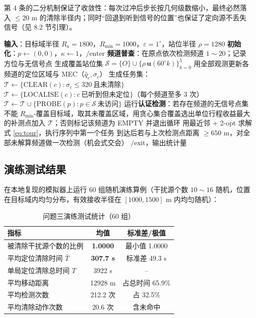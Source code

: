 第 4 条的二分机制保证了收敛性：每次过冲后步长按几何级数缩小，最终必然落入 $\le20$ m 的清除半径内；同时“回退到听到信号的位置”也保证了定向源不丢失信号（见 8.2 节引理）。

\begin{algorithm}[H]
\caption{问题三：全向干扰源搜索—定位—清除算法（CTC-V）}
\begin{algorithmic}[1]
\State \textbf{输入}：目标域半径 $R_a=1800$，$R_{\min}=1000$，$\varepsilon=1^{\circ}$，站位半径 $\rho=1280$
\State \textbf{初始化}：$p\gets(0,0)$，$\kappa\gets1$，$\text{/enter}$
\State \textbf{频道普查}：在原点依次检测频道 $1\sim20$；记录方位与无信号点
\State 生成覆盖站位集 $\mathcal S=\{O\}\cup\{\rho\,\mathbf u(60^{\circ}k)\}_{k=0}^{5}$
   \State 用全部观测更新各频道的定位区域与 MEC（$\hat q_c,\sigma_c$）
   \State 生成任务集：$\mathcal T\gets\{\text{CLEAR}(c):\sigma_c\le320\ \text{且未清除}\}$
      \State $\mathcal T\gets\{\text{LOCALISE}(c):c\ \text{已听到但未定位}\}$（每个频道至多 3 次）
   \EndIf
   \State $\mathcal T\gets\mathcal T\cup\{\text{PROBE}(p):p\in\mathcal S\ \text{未访问}\}$
      \State 运行\textbf{认证检测}：若存在频道的无信号点集不能 $R_{\min}$-覆盖目标域，取其未覆盖区域，用贪心集合覆盖选出单位行程收益最大的补测点加入 $\mathcal T$；否则标记该频道为 EMPTY 并退出循环
   \EndIf
   \State 用最近邻 + 2-opt 求解式 \eqref{eq:tour}，执行序列中第一个任务
   \State 到达后若与上次检测点距离 $\ge650$ m，对全部未解算频道做一次检测（机会式交会）
\EndWhile
\State $\text{/exit}$，输出统计量
\end{algorithmic}
\end{algorithm}

\subsection{演练测试结果}

在本地复现的模拟器上运行 60 组随机演练算例（干扰源个数 $10\sim16$ 随机，位置在目标域内均匀分布，有效接收半径在 $[1000,1500]$ m 内均匀随机）：

\begin{table}[H]
\centering
\caption{问题三演练测试统计（60 组）}
\label{tab:q3drill}
\begin{tabular}{lcc}
\toprule
指标 & 均值 & 标准差/极值\\
\midrule
被清除干扰源个数的比例 & \textbf{1.0000} & 最小值 1.0000\\
平均定位清除时间 $\bar T$ & \textbf{307.7 s} & 标准差 49.3 s\\
单局定位清除总时间 $T$ & 3922 s & --\\
平均移动距离 & 12928 m & 占总时间 65.9\%\\
平均检测次数 & 212.2 次 & 占 32.5\%\\
平均清除动作次数 & 20.6 次 & 含未命中\\
\bottomrule
\end{tabular}
\end{table}

